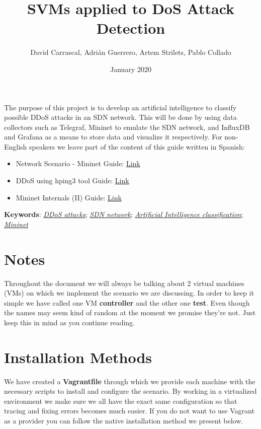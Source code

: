 \documentclass[12pt]{report}
\title{SVMs applied to DoS Attack Detection}
\author{David Carrascal, Adrián Guerrero, Artem Strilets, Pablo Collado}
\date{January 2020}
\begin{document}
	\begin{titlepage}
		\maketitle
	\end{titlepage}

	\begin{abstarct}
		The purpose of this project is to develop an artificial intelligence to classify possible DDoS attacks in an SDN network. This will be done by using data collectors such as Telegraf, Mininet to emulate the SDN network, and InfluxDB and Grafana as a means to store data and visualize it respectively. For non-English speakers we leave part of the content of this guide written in Spanish:

		\begin{itemize}
			\item Network Scenario - Mininet Guide: \href{https://hackmd.io/@davidcawork/r1fZC-nRS}{Link}
			\item DDoS using hping3 tool Guide: \href{https://hackmd.io/@davidcawork/HJ_D7jA0r}{Link}
			\item Mininet Internals (II) Guide: \href{https://hackmd.io/@davidcawork/SyrwHoNJL}{Link}
		\end{itemize}

		\textbf{Keywords}: \href{https://www.digitalattackmap.com}{\textit{DDoS attacks}}; \href{https://www.opennetworking.org/sdn-definition}{\textit{SDN network}}; \href{https://www.sciencedirect.com/science/article/abs/pii/016974399500050X}{\textit{Artificial Intelligence classification}}; \href{http://mininet.org}{\textit{Mininet}}
	\end{abstarct}

	\tableofcontents

	\section{Notes}
		Throughout the document we will always be talking about 2 virtual machines (VMs) on which we implement the scenario we are discussing. In order to keep it simple we have called one VM \textbf{controller} and the other one \textbf{test}. Even though the names may seem kind of random at the moment we promise they're not. Just keep this in mind as you continue reading.

	\section{Installation Methods}
		We have created a \textbf{Vagrantfile} through which we provide each machine with the necessary scripts to install and configure the scenario. By working in a virtualized environment we make sure we all have the exact same configuration so that tracing and fixing errors becomes much easier. If you do not want to use Vagrant as a provider you can follow the native installation method we present below.
\end{document}
